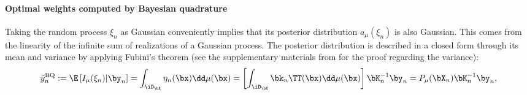 \paragraph{Optimal weights computed by Bayesian quadrature}%
Taking the random process $\xi_n$ as Gaussian conveniently implies that its posterior distribution $a_\mu(\xi_n)$ is also Gaussian. 
This comes from the linearity of the infinite sum of realizations of a Gaussian process. 
The posterior distribution is described in a closed form through its mean and variance by applying Fubini's theorem (see the supplementary materials from \cite{briol_oates_2019} for the proof regarding the variance): %
\begin{equation}
     \bar{y}_n^{\mathrm{BQ}} := \E\left[I_{\mu}(\xi_n) | \by_n \right] 
     = \int_{\iD_\bX} \eta_n(\bx) \dd \mu(\bx)
     = \left[\int_{\iD_\bX} \bk_n\TT(\bx) \dd \mu(\bx) \right] \bK_n^{-1} \by_n
     = P_\mu(\bX_n) \bK_n^{-1} \by_n,       
\label{eq:mean_post}
\end{equation}

